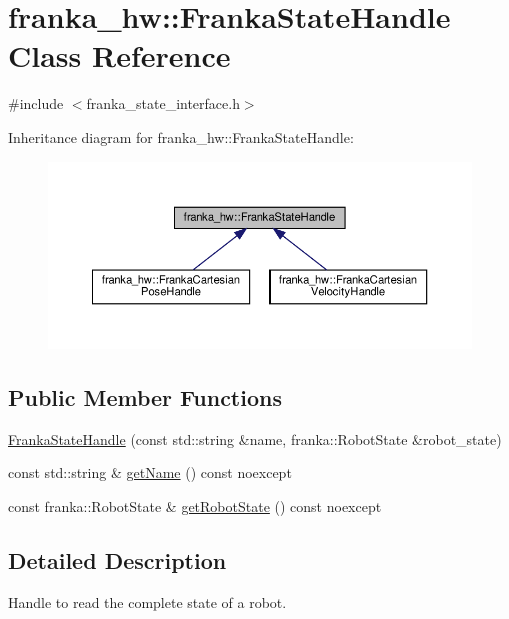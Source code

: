 \hypertarget{classfranka__hw_1_1_franka_state_handle}{}\section{franka\+\_\+hw\+:\+:Franka\+State\+Handle Class Reference}
\label{classfranka__hw_1_1_franka_state_handle}


{\ttfamily \#include $<$franka\+\_\+state\+\_\+interface.\+h$>$}



Inheritance diagram for franka\+\_\+hw\+:\+:Franka\+State\+Handle\+:
\nopagebreak
\begin{figure}[H]
\begin{center}
\leavevmode
\includegraphics[width=350pt]{classfranka__hw_1_1_franka_state_handle__inherit__graph}
\end{center}
\end{figure}
\subsection*{Public Member Functions}
\begin{DoxyCompactItemize}
\item 
\hyperlink{classfranka__hw_1_1_franka_state_handle_aa1e678a0ad409591d0ee19b9e45f19c6}{Franka\+State\+Handle} (const std\+::string \&name, franka\+::\+Robot\+State \&robot\+\_\+state)
\item 
const std\+::string \& \hyperlink{classfranka__hw_1_1_franka_state_handle_a8b1665ba53cdb85555b0e0ca6de58d0f}{get\+Name} () const noexcept
\item 
const franka\+::\+Robot\+State \& \hyperlink{classfranka__hw_1_1_franka_state_handle_a6e0be7a9ae6e86394ea273f9a84c11cb}{get\+Robot\+State} () const noexcept
\end{DoxyCompactItemize}


\subsection{Detailed Description}
Handle to read the complete state of a robot. 


